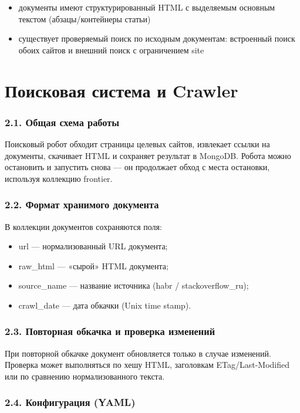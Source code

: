 \documentclass[12pt,a4paper]{article}
\begin{document}
\begin{itemize}
\item документы имеют структурированный HTML с выделяемым основным текстом (абзацы/контейнеры статьи)
\item существует проверяемый поиск по исходным документам: встроенный поиск обоих сайтов и внешний поиск с ограничением site
\end{itemize}

\section*{Поисковая система и Crawler}

\subsubsection*{2.1. Общая схема работы}

Поисковый робот обходит страницы целевых сайтов, извлекает ссылки на документы, скачивает HTML и сохраняет результат в MongoDB. Робота можно остановить и запустить снова — он продолжает обход с места остановки, используя коллекцию frontier. 

\subsubsection*{2.2. Формат хранимого документа}

В коллекции документов сохраняются поля: 

\begin{itemize}
\item url — нормализованный URL документа;
\item raw\_html — «сырой» HTML документа;
\item source\_name — название источника (habr / stackoverflow\_ru);
\item crawl\_date — дата обкачки (Unix time stamp).
\end{itemize}

\subsubsection*{2.3. Повторная обкачка и проверка изменений}

При повторной обкачке документ обновляется только в случае изменений. Проверка может выполняться по хешу HTML, заголовкам ETag/Last-Modified или по сравнению нормализованного текста. 

\subsubsection*{2.4. Конфигурация (YAML)}
\end{document}
